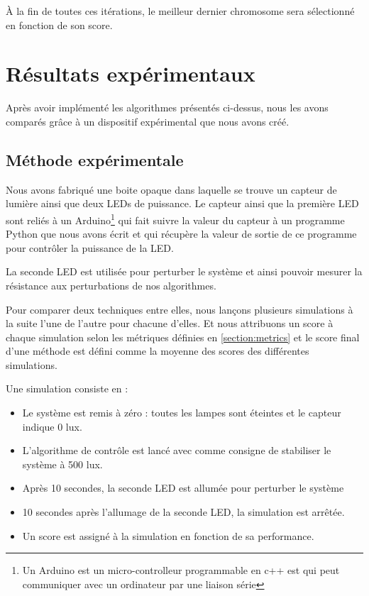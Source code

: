 \documentclass[a4paper,10pt]{report}
\begin{document}
À la fin de toutes ces itérations, le meilleur dernier chromosome sera sélectionné en fonction de son score.



\chapter{Résultats expérimentaux}

Après avoir implémenté les algorithmes présentés ci-dessus, nous les avons comparés grâce à un dispositif expérimental que nous avons créé.

\section{Méthode expérimentale}

Nous avons fabriqué une boite opaque dans laquelle se trouve un capteur de lumière ainsi que deux LEDs de puissance. Le capteur ainsi que la première LED sont reliés à un Arduino\footnote{Un Arduino est un micro-controlleur programmable en c++ est qui peut communiquer avec un ordinateur par une liaison série} qui fait suivre la valeur du capteur à un programme Python que nous avons écrit et qui récupère la valeur de sortie de ce programme pour contrôler la puissance de la LED.

La seconde LED est utilisée pour perturber le système et ainsi pouvoir mesurer la résistance aux perturbations de nos algorithmes.

Pour comparer deux techniques entre elles, nous lançons plusieurs simulations à la suite l'une de l'autre pour chacune d'elles. %
Et nous attribuons un score à chaque simulation selon les métriques définies en \ref{section:metrics} et le score final d'une méthode est défini comme la moyenne des scores des différentes simulations.

Une simulation consiste en :
\begin{itemize}
    \item Le système est remis à zéro : toutes les lampes sont éteintes et le capteur indique 0 lux.
    \item L'algorithme de contrôle est lancé avec comme consigne de stabiliser le système à 500 lux.
    \item Après 10 secondes, la seconde LED est allumée pour perturber le système
    \item 10 secondes après l'allumage de la seconde LED, la simulation est arrêtée.
    \item Un score est assigné à la simulation en fonction de sa performance.
\end{itemize}
\end{document}

